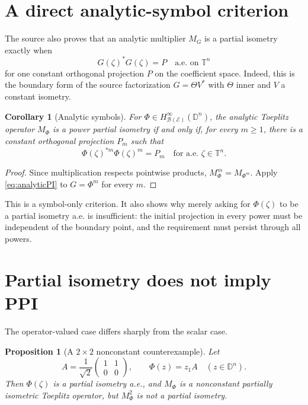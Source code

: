 \documentclass[11pt]{article}
\newtheorem{corollary}[theorem]{Corollary}
\newtheorem{proposition}[theorem]{Proposition}
\newcommand{\D}{\mathbb D}
\newcommand{\T}{\mathbb T}
\newcommand{\B}{\mathcal B}
\begin{document}
\section{A direct analytic-symbol criterion}

The source also proves that an analytic multiplier $M_G$ is a partial
isometry exactly when
\begin{equation}\label{eq:analyticPI}
 G(\zeta)^*G(\zeta)=P\quad\text{a.e. on }\T^n
\end{equation}
for one constant orthogonal projection $P$ on the coefficient space.  Indeed,
this is the boundary form of the source factorization $G=\Theta V^*$ with
$\Theta$ inner and $V$ a constant isometry.

\begin{corollary}[Analytic symbols]\label{cor:analytic}
For $\Phi\in H^\infty_{\B(\mathcal E)}(\D^n)$, the analytic Toeplitz
operator $M_\Phi$ is a power partial isometry if and only if, for every
$m\geq1$, there is a constant orthogonal projection $P_m$ such that
\begin{equation}\label{eq:analyticcriterion}
 \Phi(\zeta)^{*m}\Phi(\zeta)^m=P_m
 \quad\text{for a.e. }\zeta\in\T^n.
\end{equation}
\end{corollary}

\begin{proof}
Since multiplication respects pointwise products,
$M_\Phi^m=M_{\Phi^m}$.  Apply \eqref{eq:analyticPI} to $G=\Phi^m$ for every
$m$.
\end{proof}

This is a symbol-only criterion.  It also shows why merely asking for
$\Phi(\zeta)$ to be a partial isometry a.e. is insufficient: the initial
projection in every power must be independent of the boundary point, and the
requirement must persist through all powers.

\section{Partial isometry does not imply PPI}

The operator-valued case differs sharply from the scalar case.

\begin{proposition}[A $2\times2$ nonconstant counterexample]
Let
\[
 A=\frac1{\sqrt2}\begin{pmatrix}1&1\\0&0\end{pmatrix},
 \qquad \Phi(z)=z_1A\quad(z\in\D^n).
\]
Then $\Phi(\zeta)$ is a partial isometry a.e., and $M_\Phi$ is a nonconstant
partially isometric Toeplitz operator, but $M_\Phi^2$ is not a partial
isometry.
\end{proposition}
\end{document}
